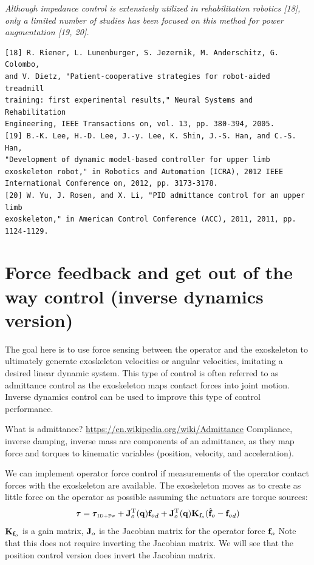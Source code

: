 \documentclass[letterpaper,12pt,fullpage]{article}
\newcommand{\invdynw}{{\mbox {\tiny ID+Fw}}}
\begin{document}
{\it Although impedance control is extensively utilized in rehabilitation
robotics [18], only a limited number of studies has been focused on
this method for power augmentation [19, 20].}
\begin{verbatim}
[18] R. Riener, L. Lunenburger, S. Jezernik, M. Anderschitz, G. Colombo,
and V. Dietz, "Patient-cooperative strategies for robot-aided treadmill
training: first experimental results," Neural Systems and Rehabilitation
Engineering, IEEE Transactions on, vol. 13, pp. 380-394, 2005.
[19] B.-K. Lee, H.-D. Lee, J.-y. Lee, K. Shin, J.-S. Han, and C.-S. Han,
"Development of dynamic model-based controller for upper limb
exoskeleton robot," in Robotics and Automation (ICRA), 2012 IEEE
International Conference on, 2012, pp. 3173-3178.
[20] W. Yu, J. Rosen, and X. Li, "PID admittance control for an upper limb
exoskeleton," in American Control Conference (ACC), 2011, 2011, pp.
1124-1129.
\end{verbatim}

\section{Force feedback and get out of the way control (inverse dynamics version)}

The goal here is to use force sensing between the operator and the
exoskeleton to ultimately generate exoskeleton velocities or angular velocities,
imitating a desired linear dynamic system.
This type of control is often referred to as admittance control as the
exoskeleton maps contact forces into joint motion.
Inverse dynamics control
can be used to improve this type of control performance.

What is admittance?
\url{https://en.wikipedia.org/wiki/Admittance}
Compliance, inverse damping, inverse mass are components of an admittance,
as they map force and torques to kinematic variables (position, velocity, and
acceleration). 

We can implement operator force control 
if measurements of the operator contact forces with
the exoskeleton are available.
The exoskeleton moves as to create as little force on the operator as possible 
assuming the actuators are torque sources:
\begin{equation}
\vtau = \vtau_{\invdynw} + \mJ_o^{\tr}(\vq) {\vf_o}_d
+ \mJ_o^{\tr}(\vq) \mK_{\vf_o} ( \hat{\vf}_o - {\vf_o}_d )
\end{equation}
${\bf K}_{{\bf f}_o}$ is a gain matrix, ${\bf J}_o$ is the Jacobian matrix for the operator
force ${\bf f}_o$
Note that this does not require inverting the Jacobian matrix.
We will see that the position control version does invert the Jacobian matrix.
\end{document}
